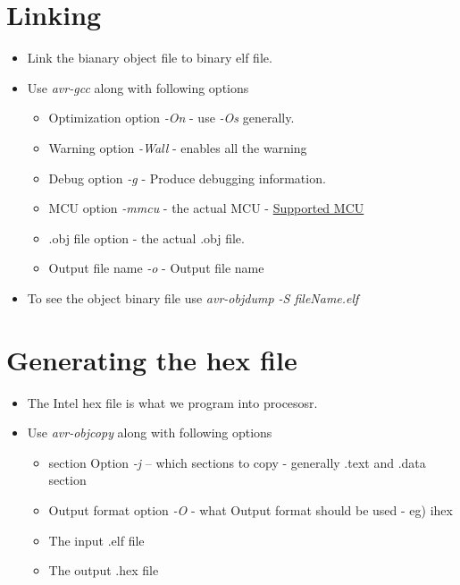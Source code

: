 \documentclass{article}
\begin{document}
\section{Linking}
\begin{itemize}
    \item Link the bianary object file to binary elf file.
    \item Use \emph{avr-gcc} along with following options
    \begin{itemize}
        \item Optimization option \emph{-On} - use \emph{-Os} generally.
        \item Warning option \emph{-Wall} - enables all the warning
        \item Debug option \emph{-g} - Produce debugging information.
        \item MCU option \emph{-mmcu} - the actual MCU - \href{https://www.nongnu.org/avr-libc/user-manual/#supp_devices}{Supported MCU}
        \item .obj file option - the actual .obj file.
        \item Output file name \emph{-o} - Output file name

    \end{itemize}
    \item To see the object binary file use \emph{avr-objdump -S fileName.elf}
\end{itemize}

\section{Generating the hex file}
\begin{itemize}
    \item The Intel hex file is what we program into procesosr.
    \item Use \emph{avr-objcopy} along with following options
    \begin{itemize}
        \item section Option \emph{-j} -- which sections to copy - generally .text and .data section
        \item Output format option \emph{-O} - what Output format should be used - eg) ihex
        \item The input .elf file
        \item The output .hex file
    \end{itemize}

\end{itemize}
\end{document}
